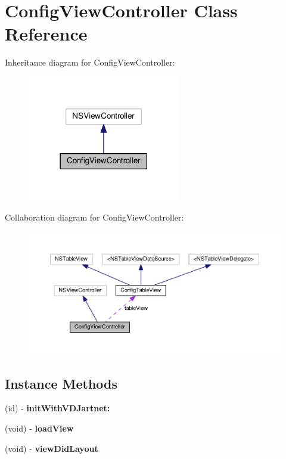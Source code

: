 \hypertarget{interfaceConfigViewController}{}\section{Config\+View\+Controller Class Reference}
\label{interfaceConfigViewController}


Inheritance diagram for Config\+View\+Controller\+:
\nopagebreak
\begin{figure}[H]
\begin{center}
\leavevmode
\includegraphics[width=189pt]{interfaceConfigViewController__inherit__graph}
\end{center}
\end{figure}


Collaboration diagram for Config\+View\+Controller\+:
\nopagebreak
\begin{figure}[H]
\begin{center}
\leavevmode
\includegraphics[width=350pt]{interfaceConfigViewController__coll__graph}
\end{center}
\end{figure}
\subsection*{Instance Methods}
\begin{DoxyCompactItemize}
\item 
\mbox{\label{interfaceConfigViewController_aa8041471bf58ccce553995071fe913bf}} 
(id) -\/ {\bfseries init\+With\+V\+D\+Jartnet\+:}
\item 
\mbox{\label{interfaceConfigViewController_ab844ba3ae117280d72070390cdf93571}} 
(void) -\/ {\bfseries load\+View}
\item 
\mbox{\label{interfaceConfigViewController_ade565be573576edc51a964c787ab9709}} 
(void) -\/ {\bfseries view\+Did\+Layout}
\end{DoxyCompactItemize}
